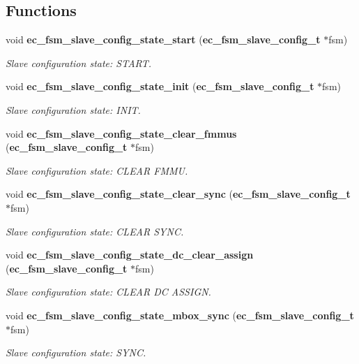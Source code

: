 \subsection*{\-Functions}
\begin{DoxyCompactItemize}
\item 
void {\bf ec\-\_\-fsm\-\_\-slave\-\_\-config\-\_\-state\-\_\-start} ({\bf ec\-\_\-fsm\-\_\-slave\-\_\-config\-\_\-t} $\ast$fsm)
\begin{DoxyCompactList}\small\item\em \-Slave configuration state\-: \-S\-T\-A\-R\-T. \end{DoxyCompactList}\item 
void {\bf ec\-\_\-fsm\-\_\-slave\-\_\-config\-\_\-state\-\_\-init} ({\bf ec\-\_\-fsm\-\_\-slave\-\_\-config\-\_\-t} $\ast$fsm)
\begin{DoxyCompactList}\small\item\em \-Slave configuration state\-: \-I\-N\-I\-T. \end{DoxyCompactList}\item 
void {\bf ec\-\_\-fsm\-\_\-slave\-\_\-config\-\_\-state\-\_\-clear\-\_\-fmmus} ({\bf ec\-\_\-fsm\-\_\-slave\-\_\-config\-\_\-t} $\ast$fsm)
\begin{DoxyCompactList}\small\item\em \-Slave configuration state\-: \-C\-L\-E\-A\-R \-F\-M\-M\-U. \end{DoxyCompactList}\item 
void {\bf ec\-\_\-fsm\-\_\-slave\-\_\-config\-\_\-state\-\_\-clear\-\_\-sync} ({\bf ec\-\_\-fsm\-\_\-slave\-\_\-config\-\_\-t} $\ast$fsm)
\begin{DoxyCompactList}\small\item\em \-Slave configuration state\-: \-C\-L\-E\-A\-R \-S\-Y\-N\-C. \end{DoxyCompactList}\item 
void {\bf ec\-\_\-fsm\-\_\-slave\-\_\-config\-\_\-state\-\_\-dc\-\_\-clear\-\_\-assign} ({\bf ec\-\_\-fsm\-\_\-slave\-\_\-config\-\_\-t} $\ast$fsm)
\begin{DoxyCompactList}\small\item\em \-Slave configuration state\-: \-C\-L\-E\-A\-R \-D\-C \-A\-S\-S\-I\-G\-N. \end{DoxyCompactList}\item 
void {\bf ec\-\_\-fsm\-\_\-slave\-\_\-config\-\_\-state\-\_\-mbox\-\_\-sync} ({\bf ec\-\_\-fsm\-\_\-slave\-\_\-config\-\_\-t} $\ast$fsm)
\begin{DoxyCompactList}\small\item\em \-Slave configuration state\-: \-S\-Y\-N\-C. \end{DoxyCompactList}\item 

\end{DoxyCompactItemize}
